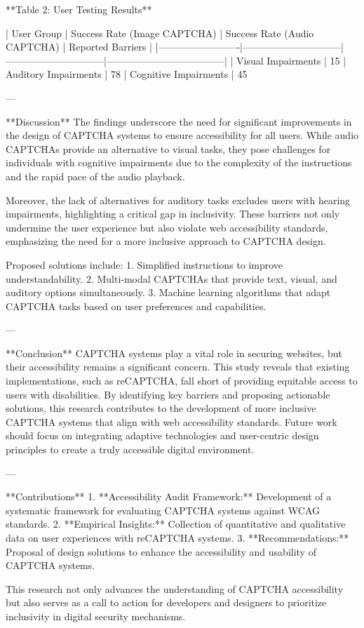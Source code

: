 **Table 2: User Testing Results**  

| User Group              | Success Rate (Image CAPTCHA) | Success Rate (Audio CAPTCHA) | Reported Barriers                  |  
|-------------------------|------------------------------|------------------------------|------------------------------------|  
| Visual Impairments      | 15%
| Auditory Impairments    | 78%
| Cognitive Impairments   | 45%

---

**Discussion**  
The findings underscore the need for significant improvements in the design of CAPTCHA systems to ensure accessibility for all users. While audio CAPTCHAs provide an alternative to visual tasks, they pose challenges for individuals with cognitive impairments due to the complexity of the instructions and the rapid pace of the audio playback.  

Moreover, the lack of alternatives for auditory tasks excludes users with hearing impairments, highlighting a critical gap in inclusivity. These barriers not only undermine the user experience but also violate web accessibility standards, emphasizing the need for a more inclusive approach to CAPTCHA design.  

Proposed solutions include:  
1. Simplified instructions to improve understandability.  
2. Multi-modal CAPTCHAs that provide text, visual, and auditory options simultaneously.  
3. Machine learning algorithms that adapt CAPTCHA tasks based on user preferences and capabilities.  

---

**Conclusion**  
CAPTCHA systems play a vital role in securing websites, but their accessibility remains a significant concern. This study reveals that existing implementations, such as reCAPTCHA, fall short of providing equitable access to users with disabilities. By identifying key barriers and proposing actionable solutions, this research contributes to the development of more inclusive CAPTCHA systems that align with web accessibility standards. Future work should focus on integrating adaptive technologies and user-centric design principles to create a truly accessible digital environment.  

---

**Contributions**  
1. **Accessibility Audit Framework:** Development of a systematic framework for evaluating CAPTCHA systems against WCAG standards.  
2. **Empirical Insights:** Collection of quantitative and qualitative data on user experiences with reCAPTCHA systems.  
3. **Recommendations:** Proposal of design solutions to enhance the accessibility and usability of CAPTCHA systems.  

This research not only advances the understanding of CAPTCHA accessibility but also serves as a call to action for developers and designers to prioritize inclusivity in digital security mechanisms.  